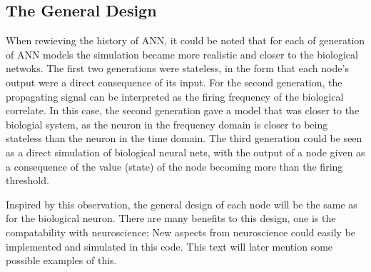 














	\subsection{The General Design}
	\label{ssecTheGeneralDesign}
		When rewieving the history of ANN, it could be noted that for each of generation of ANN models the simulation became more realistic and closer to the biological netwoks.
		The first two generations were stateless, in the form that each node's output were a direct consequence of its input.
		For the second generation, the propagating signal can be interpreted as the firing frequency of the biological correlate.
		In this case, the second generation gave a model that was closer to the biologial system, as the neuron in the frequency domain is closer to being stateless than the neuron in the time domain.
		The third generation could be seen as a direct simulation of biological neural nets, with the output of a node given as a consequence of the value (state) of the node becoming more than the firing threshold.
	
		Inspired by this observation, the general design of each node will %
			be the same as for the biological neuron.
		There are many benefits to this design, one is the compatability with neuroscience;
			New aspects from neuroscience could easily be implemented and simulated in this code.
		This text will later mention some possible examples of this. %

